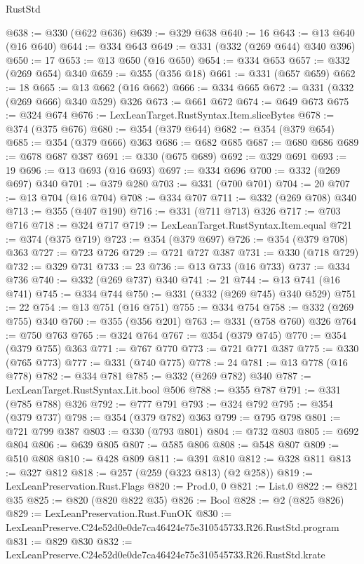 \begin{lexlean}{RustStd}
\begin{coremodule}
@638 := @330 (@622 @636)
@639 := @329 @638
@640 := 16
@643 := @13 @640 (@16 @640)
@644 := @334 @643
@649 := @331 (@332 (@269 @644) @340 @396)
@650 := 17
@653 := @13 @650 (@16 @650)
@654 := @334 @653
@657 := @332 (@269 @654) @340
@659 := @355 (@356 @18)
@661 := @331 (@657 @659)
@662 := 18
@665 := @13 @662 (@16 @662)
@666 := @334 @665
@672 := @331 (@332 (@269 @666) @340 @529) @326
@673 := @661 @672
@674 := @649 @673
@675 := @324 @674
@676 := LexLeanTarget.RustSyntax.Item.sliceBytes
@678 := @374 (@375 @676)
@680 := @354 (@379 @644)
@682 := @354 (@379 @654)
@685 := @354 (@379 @666) @363
@686 := @682 @685
@687 := @680 @686
@689 := @678 @687 @387
@691 := @330 (@675 @689)
@692 := @329 @691
@693 := 19
@696 := @13 @693 (@16 @693)
@697 := @334 @696
@700 := @332 (@269 @697) @340
@701 := @379 @280
@703 := @331 (@700 @701)
@704 := 20
@707 := @13 @704 (@16 @704)
@708 := @334 @707
@711 := @332 (@269 @708) @340
@713 := @355 (@407 @190)
@716 := @331 (@711 @713) @326
@717 := @703 @716
@718 := @324 @717
@719 := LexLeanTarget.RustSyntax.Item.equal
@721 := @374 (@375 @719)
@723 := @354 (@379 @697)
@726 := @354 (@379 @708) @363
@727 := @723 @726
@729 := @721 @727 @387
@731 := @330 (@718 @729)
@732 := @329 @731
@733 := 23
@736 := @13 @733 (@16 @733)
@737 := @334 @736
@740 := @332 (@269 @737) @340
@741 := 21
@744 := @13 @741 (@16 @741)
@745 := @334 @744
@750 := @331 (@332 (@269 @745) @340 @529)
@751 := 22
@754 := @13 @751 (@16 @751)
@755 := @334 @754
@758 := @332 (@269 @755) @340
@760 := @355 (@356 @201)
@763 := @331 (@758 @760) @326
@764 := @750 @763
@765 := @324 @764
@767 := @354 (@379 @745)
@770 := @354 (@379 @755) @363
@771 := @767 @770
@773 := @721 @771 @387
@775 := @330 (@765 @773)
@777 := @331 (@740 @775)
@778 := 24
@781 := @13 @778 (@16 @778)
@782 := @334 @781
@785 := @332 (@269 @782) @340
@787 := LexLeanTarget.RustSyntax.Lit.bool @506
@788 := @355 @787
@791 := @331 (@785 @788) @326
@792 := @777 @791
@793 := @324 @792
@795 := @354 (@379 @737)
@798 := @354 (@379 @782) @363
@799 := @795 @798
@801 := @721 @799 @387
@803 := @330 (@793 @801)
@804 := @732 @803
@805 := @692 @804
@806 := @639 @805
@807 := @585 @806
@808 := @548 @807
@809 := @510 @808
@810 := @428 @809
@811 := @391 @810
@812 := @328 @811
@813 := @327 @812
@818 := @257 (@259 (@323 @813) (@2 @258))
@819 := LexLeanPreservation.Rust.Flags
@820 := Prod.{0, 0}
@821 := List.{0}
@822 := @821 @35
@825 := @820 (@820 @822 @35)
@826 := Bool
@828 := @2 (@825 @826)
@829 := LexLeanPreservation.Rust.FunOK
@830 := LexLeanPreserve.C24e52d0e0de7ca46424e75e310545733.R26.RustStd.program
@831 := @829 @830
@832 := LexLeanPreserve.C24e52d0e0de7ca46424e75e310545733.R26.RustStd.krate

\end{coremodule}
\end{lexlean}
